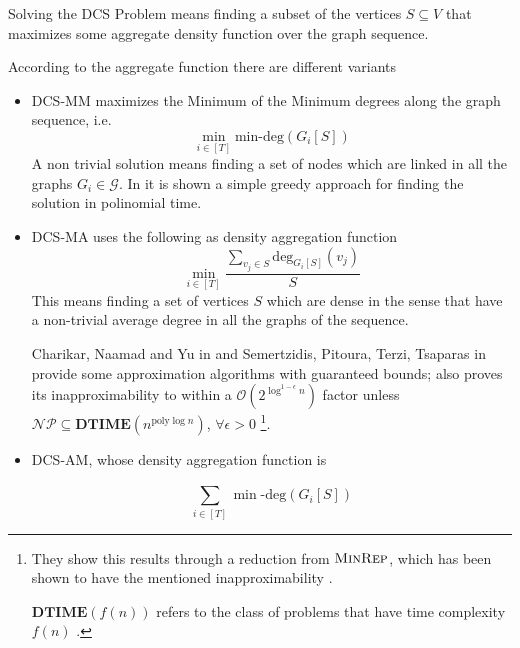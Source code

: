 Solving the \acrlong{DCS} Problem means finding a subset
of the vertices $S \subseteq V$ that maximizes some aggregate density function
over the graph sequence.

According to the aggregate function there are different variants

\begin{itemize}
	\item \acrshort{DCS}-MM maximizes the Minimum of the Minimum degrees along
	      the graph sequence, i.e.
	      \begin{equation}
		      \label{eq:dcs-mm}
		      \min_{i \in [T]} \text{min-deg} (G_i[S])
	      \end{equation}
	      A non trivial solution means finding a set of nodes which are linked
	      in all the graphs $G_i \in \mathcal{G} $.
	      In \cite{semertzidis2019finding} it is shown a simple greedy approach
	      for finding the solution in polinomial time.
	\item \acrshort{DCS}-MA uses the following as density aggregation function
	      \begin{equation}
		      \label{eq:dcs-ma}
		      \min_{i \in [T]}
		      \frac{\sum^{}_{v_{j} \in S } \text{deg}_{G_i[S]} (v_{j} )}{S}
	      \end{equation}
	      This means finding a set of vertices $S$ which are dense in the sense
	      that have a non-trivial average degree in all the graphs of the
	      sequence.


	      Charikar, Naamad and Yu in \cite{charikar2018finding} and
	      Semertzidis, Pitoura, Terzi, Tsaparas in
	      \cite{semertzidis2019finding} provide some
	      approximation algorithms with guaranteed bounds;
	      \cite{charikar2018finding} also proves its
	      inapproximability to within a $\mathcal{O}(2 ^{\log^{1-\epsilon} n} )
	      $ factor unless $\mathcal{NP} \subseteq \mathbf{DTIME} (n
		      ^{\text{poly}\log n} ) $, $\forall \epsilon > 0$
	      \footnote{They show this results through a reduction from
	      $\textsc{MinRep}$, which has been shown to have the mentioned
	      inapproximability \cite{charikar2018finding}\cite{kortsarz2001hardness}.

	      $ \mathbf{DTIME}(f(n)) $ refers to the class of problems that
	      have time complexity $f(n)$ \cite{9780521884730}.
	      }.
	\item \acrshort{DCS}-AM, whose density aggregation function is

	      \begin{equation}
		      \label{eq:dcs-am}
		      \sum^{}_{i \in [T]} \min\text{-deg} (G_i [S])
	      \end{equation}


\end{itemize}
